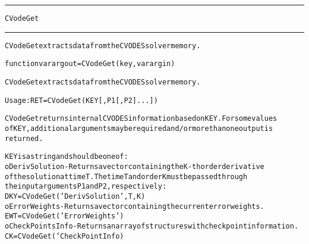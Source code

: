 \begin{samepage}
\hrule
\begin{center}
{\large \verb!CVodeGet!}
\label{p:CVodeGet}
\end{center}
\hrule\vspace{0.1in}



\begin{alltt}
CVodeGet extracts data from the CVODES solver memory.
\end{alltt}

\end{samepage}



\begin{samepage}


\begin{alltt}
function varargout = CVodeGet(key, varargin) 
\end{alltt}

\end{samepage}



\begin{alltt}
CVodeGet extracts data from the CVODES solver memory.

   Usage: RET = CVodeGet ( KEY [, P1 [, P2] ... ]) 

   CVodeGet returns internal CVODES information based on KEY. For some values
   of KEY, additional arguments may be required and/or more than one output is
   returned.

   KEY is a string and should be one of:
    o DerivSolution - Returns a vector containing the K-th order derivative
       of the solution at time T. The time T and order K must be passed through 
       the input arguments P1 and P2, respectively:
       DKY = CVodeGet('DerivSolution', T, K)
    o ErrorWeights - Returns a vector containing the current error weights.
       EWT = CVodeGet('ErrorWeights')
    o CheckPointsInfo - Returns an array of structures with check point information.
       CK = CVodeGet('CheckPointInfo)
\end{alltt}






\vspace{0.1in}